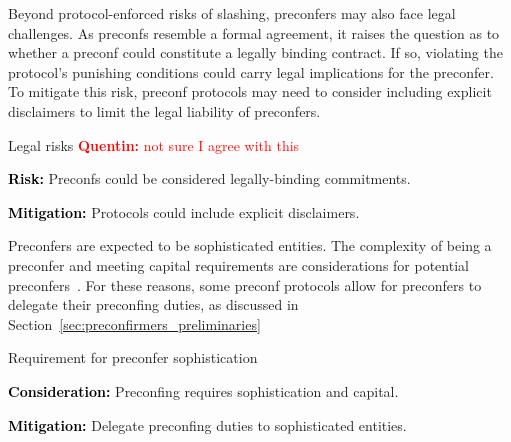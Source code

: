 \documentclass[a4paper]{article}
\theoremstyle{boldstyle}
\newlength{\entrysep}
\newcommand{\risk}[1]{\par\noindent\textbf{\textcolor{black}{Risk:}} #1\par\vspace{\entrysep}}
\newcommand{\consideration}[1]{\par\noindent\textbf{\textcolor{black}{Consideration:}} #1\par\vspace{\entrysep}}
\newcommand{\mitigation}[1]{\par\noindent\textbf{\textcolor{black}{Mitigation:}} #1}
\newcommand{\qb}[1]{\textcolor{red}{\textbf{Quentin:} #1}}
\newcommand{\todoqb}[1]{\todo[color=red!40]{\textbf{Quentin:} #1}}
\begin{document}
        Beyond protocol-enforced risks of slashing, preconfers may also face legal challenges. As preconfs resemble a formal agreement, it raises the question as to whether a preconf could constitute a legally binding contract. If so, violating the protocol's punishing conditions could carry legal implications for the preconfer.
        To mitigate this risk, preconf protocols may need to consider including explicit disclaimers to limit the legal liability of preconfers.
        \begin{riskbox}{Legal risks \qb{not sure I agree with this}}
            \risk{Preconfs could be considered legally-binding commitments.}
            \mitigation{Protocols could include explicit disclaimers.}
        \end{riskbox}
        Preconfers are expected to be sophisticated entities. The complexity of being a preconfer and meeting capital requirements are considerations for potential preconfers~\cite{W:Towardsanimplementationofbasedpreconfirmationsleveragingrestaking,W:AnalysingExpectedProposerRevenuefromPreconfirmations}. For these reasons, some preconf protocols allow for preconfers to delegate their preconfing duties, as discussed in Section~\ref{sec:preconfirmers_preliminaries}
        \begin{considerationbox}{Requirement for preconfer sophistication}
            \consideration{Preconfing requires sophistication and capital.}
            \mitigation{Delegate preconfing duties to sophisticated entities.}
        \end{considerationbox}

\end{document}
